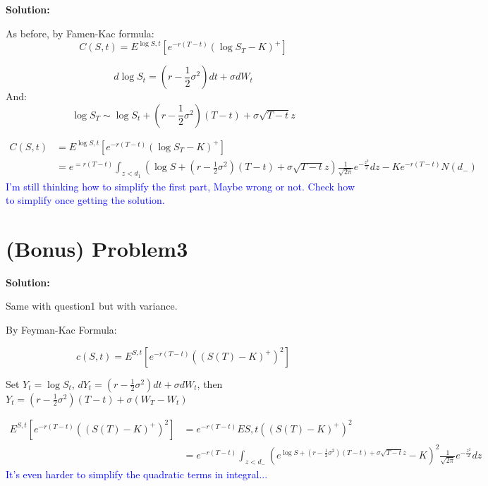 \documentclass[11pt]{article} %
\begin{document}
\textbf{Solution:}

As before, by Famen-Kac formula:
\begin{equation*}
    C(S,t) = E^{\log S, t}[e^{-r(T-t)}(\log S_T - K)^+]
\end{equation*}

\begin{equation*}
    d\log S_t = (r-\frac{1}{2}\sigma^2)dt + \sigma dW_t
\end{equation*}
And:
\begin{equation*}
    \log S_T \sim \log S_t +(r-\frac{1}{2}\sigma^2)(T-t)+\sigma \sqrt{T-t}z
\end{equation*}

\begin{align*}
    C(S,t) &= E^{\log S, t}[e^{-r(T-t)}(\log S_T - K)^+]\\
        &= e^{=r(T-t)}\int_{z<d_1}(\log S + (r-\frac{1}{2}\sigma^2)(T-t)+\sigma \sqrt{T-t}z) \frac{1}{\sqrt{2\pi}}e^{-\frac{z^2}{2}}dz-Ke^{-r(T-t)}N(d_-)
\end{align*}
\textcolor{blue}{I'm still thinking how to simplify the first part, Maybe wrong or not. Check how to simplify once getting the solution.}


\section*{(Bonus) Problem3}
\textbf{Solution:}

Same with question1 but with variance.

By Feyman-Kac Formula:

\begin{equation*}
    c(S,t) = E^{S,t}[e^{-r(T-t)}((S(T)-K)^{+})^2]
\end{equation*}

Set $Y_t = \log S_t$, $dY_t = (r-\frac{1}{2}\sigma^2)dt + \sigma dW_t$, then $Y_t = (r-\frac{1}{2}\sigma^2)(T-t)+\sigma(W_T-W_t)$

\begin{align*}
    E^{S,t}[e^{-r(T-t)}((S(T)-K)^{+})^2] &= e^{-r(T-t)}E{S,t}((S(T)-K)^{+})^2\\
                                        &= e^{-r(T-t)}\int_{z<d_-} (e^{\log S +(r-\frac{1}{2}\sigma^2)(T-t)+\sigma \sqrt{T-t}z}-K)^2 \frac{1}{\sqrt{2\pi}}e^{-\frac{z^2}{2}}dz
\end{align*}
\textcolor{blue}{It's even harder to simplify the quadratic terms in integral...}
\end{document}
